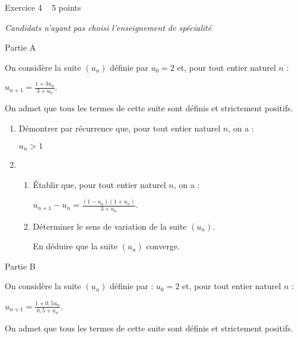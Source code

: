 
%
\begin{h2}Exercice 4   5 points\end{h2}
\textit{Candidats n'ayant pas choisi l'enseignement de spécialité}
\begin{h3}Partie A\end{h3}
On considère la suite $\left(u_{n}\right)$ définie par $u_{0}=2$ et, pour tout entier naturel $n$ :
\begin{center}$u_{n+1}=\frac{1+3u_{n}}{3+u_{n}}.$\end{center}
On admet que tous les termes de cette suite sont définis et strictement positifs.
\begin{enumerate}
     \item
     Démontrer par récurrence que, pour tout entier naturel $n$, on a :
     \begin{center}$u_{n} > 1$\end{center}
     \item
     \begin{enumerate}[label=\alph*.]
          \item
          Établir que, pour tout entier naturel $n$, on a :
          \begin{center}$u_{n+1}- u_{n}=\frac{\left(1-u_{n} \right)\left(1+u_{n}\right)}{3+ u_{n}}$.\end{center}
          \item
          Déterminer le sens de variation de la suite $\left(u_{n}\right)$.
          \par
          En déduire que la suite $\left(u_{n}\right)$ converge.
     \end{enumerate}
\end{enumerate}
\begin{h3}Partie B\end{h3}
On considère la suite $\left(u_{n}\right)$ définie par : $u_{0}=2$ et, pour tout entier naturel $n$ :
\begin{center}$ u_{n+1}=\frac{1+0,5u_{n}}{0,5+u_{n}}.$\end{center}
On admet que tous les termes de cette suite sont définis et strictement positifs.
